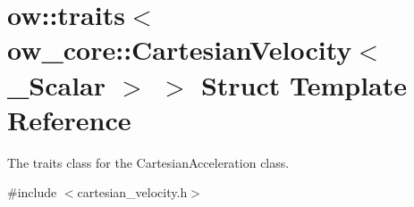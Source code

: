 \hypertarget{structow_1_1traits_3_01ow__core_1_1CartesianVelocity_3_01__Scalar_01_4_01_4}{}\section{ow\+:\+:traits$<$ ow\+\_\+core\+:\+:Cartesian\+Velocity$<$ \+\_\+\+Scalar $>$ $>$ Struct Template Reference}
\label{structow_1_1traits_3_01ow__core_1_1CartesianVelocity_3_01__Scalar_01_4_01_4}


The traits class for the Cartesian\+Acceleration class.  




{\ttfamily \#include $<$cartesian\+\_\+velocity.\+h$>$}

